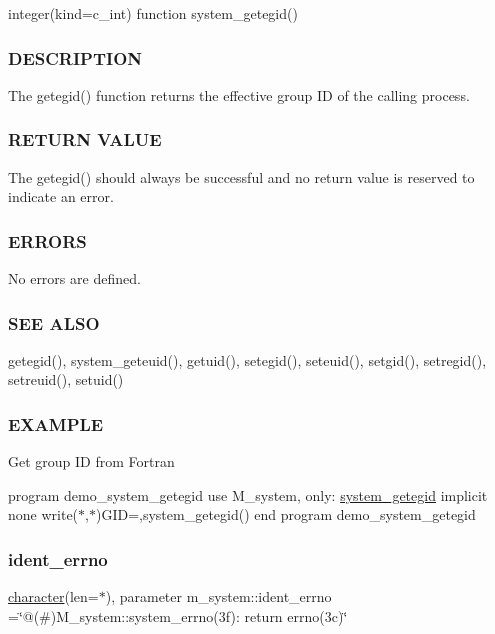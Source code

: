 integer(kind=c\+\_\+int) function system\+\_\+getegid() \subsubsection*{D\+E\+S\+C\+R\+I\+P\+T\+I\+ON}

The getegid() function returns the effective group ID of the calling process.

\subsubsection*{R\+E\+T\+U\+RN V\+A\+L\+UE}

The getegid() should always be successful and no return value is reserved to indicate an error.

\subsubsection*{E\+R\+R\+O\+RS}

No errors are defined.

\subsubsection*{S\+EE A\+L\+SO}

getegid(), system\+\_\+geteuid(), getuid(), setegid(), seteuid(), setgid(), setregid(), setreuid(), setuid()

\subsubsection*{E\+X\+A\+M\+P\+LE}

Get group ID from Fortran

program demo\+\_\+system\+\_\+getegid use M\+\_\+system, only\+: \hyperlink{interfacem__system_1_1system__getegid}{system\+\_\+getegid} implicit none write($\ast$,$\ast$)\textquotesingle{}G\+ID=\textquotesingle{},system\+\_\+getegid() end program demo\+\_\+system\+\_\+getegid \mbox{\label{namespacem__system_af87dabd7c9a2c38ccb3794b5185f24d8}} 
\subsubsection{\texorpdfstring{ident\+\_\+errno}{ident\_errno}}
{\footnotesize\ttfamily \hyperlink{option__stopwatch_83_8txt_abd4b21fbbd175834027b5224bfe97e66}{character}(len=$\ast$), parameter m\+\_\+system\+::ident\+\_\+errno =\char`\"{}@(\#)M\+\_\+system\+::system\+\_\+errno(3f)\+: return errno(3c)\char`\"{}\hspace{0.3cm}{\ttfamily [private]}}



